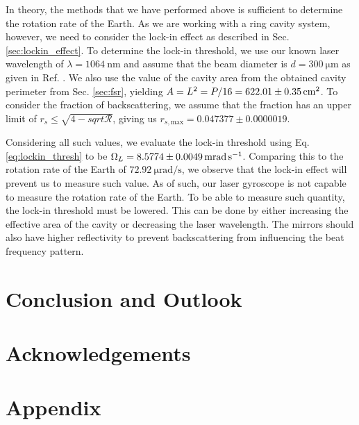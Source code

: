 \documentclass[a4paper]{report}
\numberwithin{equation}{section}
\begin{document}
In theory, the methods that we have performed above is sufficient to determine the rotation rate of the Earth. As we are 
working with a ring cavity system, however, we need to consider the lock-in effect as described in Sec. \ref{sec:lockin_effect}. 
To determine the lock-in threshold, we use our known laser wavelength of $\lambda = \SI{1064}{\nano\metre}$ and assume that the
 beam diameter is $d = \SI{300}{\micro\metre}$ as given in Ref. \cite{Groh2021}.
We also use the value of the cavity area from the obtained cavity perimeter from Sec. \ref{sec:fsr}, yielding
$A = L^2 = P / 16 = \SI{622.01 \pm 0.35}{\centi\meter\squared}$. To consider the fraction of backscattering, we assume that the 
fraction has an upper limit of $r_s \leq \sqrt{4 - sqrt{\mathcal{R}}}$, giving us $r_{s, \mathrm{max}} = 0.047377 \pm 0.0000019$. \par 

Considering all such values, we evaluate the lock-in threshold using Eq. \ref{eq:lockin_thresh} to be $\Omega_L = \SI{8.5774 +- 0.0049}{\milli\radian\per\second}$. 
Comparing this to the rotation rate of the Earth of $\SI{72.92}{\micro\radian\per\second}$, we observe that the lock-in effect will 
prevent us to measure such value. As of such, our laser gyroscope is not capable to measure the rotation rate of the Earth. To be 
able to measure such quantity, the lock-in threshold must be lowered. This can be done by either increasing the effective area of 
the cavity or decreasing the laser wavelength. The mirrors should also have higher reflectivity to prevent backscattering 
from influencing the beat frequency pattern.\par 


\chapter{Conclusion and Outlook}

\chapter{Acknowledgements}

\printbibliography

\chapter{Appendix} \label{chap:appendix}

\printbibliography
\end{document}
